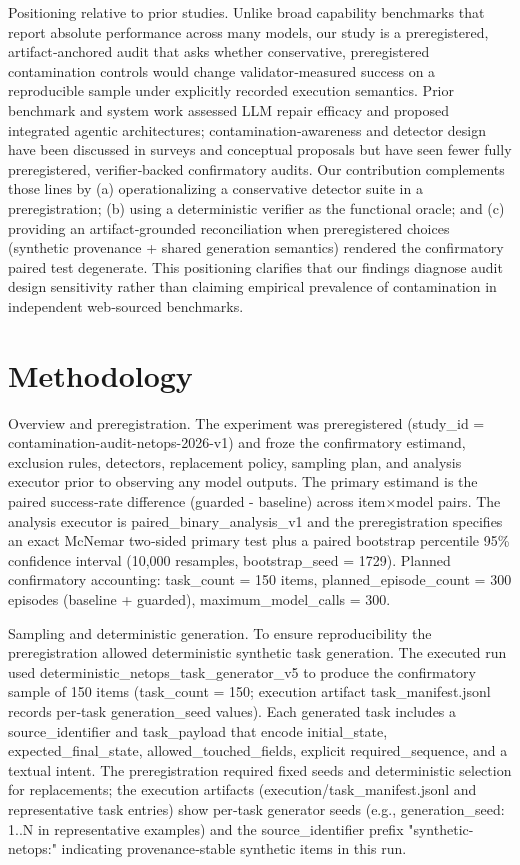 \documentclass[conference]{IEEEtran}
\begin{document}
Positioning relative to prior studies. Unlike broad capability benchmarks that report absolute performance across many models, our study is a preregistered, artifact‑anchored audit that asks whether conservative, preregistered contamination controls would change validator‑measured success on a reproducible sample under explicitly recorded execution semantics. Prior benchmark and system work assessed LLM repair efficacy and proposed integrated agentic architectures; contamination‑awareness and detector design have been discussed in surveys and conceptual proposals but have seen fewer fully preregistered, verifier‑backed confirmatory audits. Our contribution complements those lines by (a) operationalizing a conservative detector suite in a preregistration; (b) using a deterministic verifier as the functional oracle; and (c) providing an artifact‑grounded reconciliation when preregistered choices (synthetic provenance + shared generation semantics) rendered the confirmatory paired test degenerate. This positioning clarifies that our findings diagnose audit design sensitivity rather than claiming empirical prevalence of contamination in independent web‑sourced benchmarks.

\section{Methodology}
Overview and preregistration. The experiment was preregistered (study\_id = contamination-audit-netops-2026-v1) and froze the confirmatory estimand, exclusion rules, detectors, replacement policy, sampling plan, and analysis executor prior to observing any model outputs. The primary estimand is the paired success‑rate difference (guarded - baseline) across item\ensuremath{\times}model pairs. The analysis executor is paired\_binary\_analysis\_v1 and the preregistration specifies an exact McNemar two‑sided primary test plus a paired bootstrap percentile 95\% confidence interval (10,000 resamples, bootstrap\_seed = 1729). Planned confirmatory accounting: task\_count = 150 items, planned\_episode\_count = 300 episodes (baseline + guarded), maximum\_model\_calls = 300.

Sampling and deterministic generation. To ensure reproducibility the preregistration allowed deterministic synthetic task generation. The executed run used deterministic\_netops\_task\_generator\_v5 to produce the confirmatory sample of 150 items (task\_count = 150; execution artifact task\_manifest.jsonl records per‑task generation\_seed values). Each generated task includes a source\_identifier and task\_payload that encode initial\_state, expected\_final\_state, allowed\_touched\_fields, explicit required\_sequence, and a textual intent. The preregistration required fixed seeds and deterministic selection for replacements; the execution artifacts (execution/task\_manifest.jsonl and representative task entries) show per‑task generator seeds (e.g., generation\_seed: 1..N in representative examples) and the source\_identifier prefix "synthetic-netops:" indicating provenance‑stable synthetic items in this run.
\end{document}
